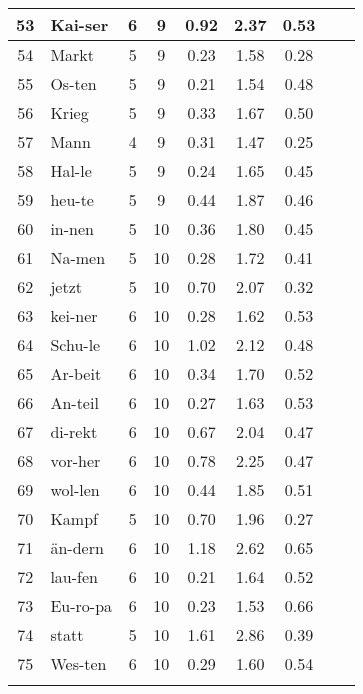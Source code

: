 {\begin{longtable}{clccccccc}
53 & Kai-ser & 6 & 9 & 0.92 & 2.37 & 0.53 \\ \hline
54 & Markt & 5 & 9 & 0.23 & 1.58 & 0.28 \\ \hline
55 & Os-ten & 5 & 9 & 0.21 & 1.54 & 0.48 \\ \hline
56 & Krieg & 5 & 9 & 0.33 & 1.67 & 0.50 \\ \hline
57 & Mann & 4 & 9 & 0.31 & 1.47 & 0.25 \\ \hline
58 & Hal-le & 5 & 9 & 0.24 & 1.65 & 0.45 \\ \hline
59 & heu-te & 5 & 9 & 0.44 & 1.87 & 0.46 \\ \hline
60 & in-nen & 5 & 10 & 0.36 & 1.80 & 0.45 \\ \hline
61 & Na-men & 5 & 10 & 0.28 & 1.72 & 0.41 \\ \hline
62 & jetzt & 5 & 10 & 0.70 & 2.07 & 0.32 \\ \hline
63 & kei-ner & 6 & 10 & 0.28 & 1.62 & 0.53 \\ \hline
64 & Schu-le & 6 & 10 & 1.02 & 2.12 & 0.48 \\ \hline
65 & Ar-beit & 6 & 10 & 0.34 & 1.70 & 0.52 \\ \hline
66 & An-teil & 6 & 10 & 0.27 & 1.63 & 0.53 \\ \hline
67 & di-rekt & 6 & 10 & 0.67 & 2.04 & 0.47 \\ \hline
68 & vor-her & 6 & 10 & 0.78 & 2.25 & 0.47 \\ \hline
69 & wol-len & 6 & 10 & 0.44 & 1.85 & 0.51 \\ \hline
70 & Kampf & 5 & 10 & 0.70 & 1.96 & 0.27 \\ \hline
71 & än-dern & 6 & 10 & 1.18 & 2.62 & 0.65 \\ \hline
72 & lau-fen & 6 & 10 & 0.21 & 1.64 & 0.52 \\ \hline
73 & Eu-ro-pa & 6 & 10 & 0.23 & 1.53 & 0.66 \\ \hline
74 & statt & 5 & 10 & 1.61 & 2.86 & 0.39 \\ \hline
75 & Wes-ten & 6 & 10 & 0.29 & 1.60 & 0.54 \\
\bottomrule
\label{tab:wordlist}
\end{longtable}
}